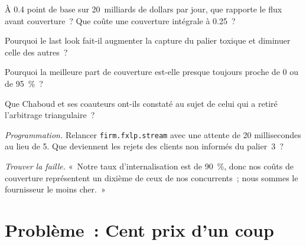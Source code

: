 \begin{exercise}[$\star$]\label{exo:hf:fx-market-making:3}
À 0.4 point de base sur 20~milliards de dollars par jour, que rapporte le flux avant couverture~? Que coûte une couverture intégrale à 0.25~?
\end{exercise}

\begin{exercise}[$\star\star$]\label{exo:hf:fx-market-making:4}
Pourquoi le last look fait-il augmenter la capture du palier toxique et diminuer celle des autres~?
\end{exercise}

\begin{exercise}[$\star\star$]\label{exo:hf:fx-market-making:5}
Pourquoi la meilleure part de couverture est-elle presque toujours proche de 0 ou de 95~\%~?
\end{exercise}

\begin{exercise}[$\star\star$]\label{exo:hf:fx-market-making:6}
Que Chaboud et ses coauteurs ont-ils constaté au sujet de celui qui a retiré l'arbitrage triangulaire~?
\end{exercise}

\begin{exercise}[$\star\star\star$]\label{exo:hf:fx-market-making:7}
\emph{Programmation.} Relancer \texttt{firm.fxlp.stream} avec une attente de 20 millisecondes au lieu de 5. Que deviennent les rejets des clients non informés du palier~3~?
\end{exercise}

\begin{exercise}[$\star\star\star$]\label{exo:hf:fx-market-making:8}
\emph{Trouver la faille.} «~Notre taux d'internalisation est de 90~\%, donc nos coûts de couverture représentent un dixième de ceux de nos concurrents~; nous sommes le fournisseur le moins cher.~»
\end{exercise}

\section{Problème~: Cent prix d'un coup}


